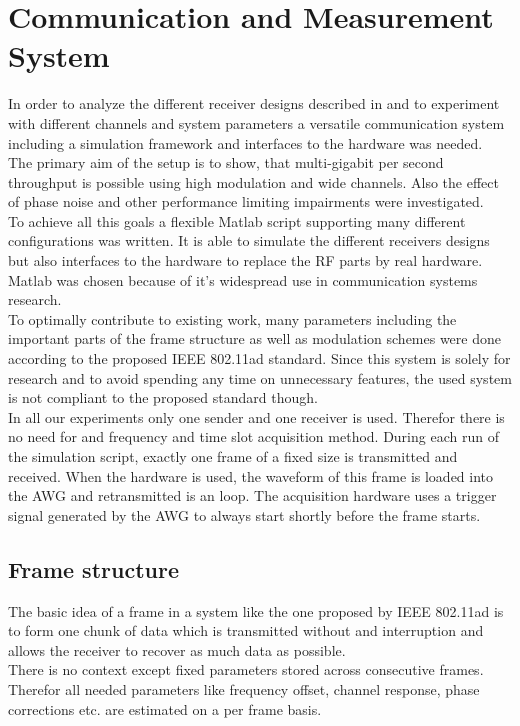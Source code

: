 \chapter{Communication and Measurement System}
In order to analyze the different receiver designs described in
 and to experiment with different channels
and system parameters a versatile communication system
including a simulation framework and interfaces to the hardware
was needed. \\

The primary aim of the setup is to show, that multi-gigabit per second
throughput is possible using high modulation and wide channels.
Also the effect of phase noise and other performance limiting impairments
were investigated. \\

To achieve all this goals a flexible Matlab script supporting
many different configurations was written. It is able to simulate
the different receivers designs but also interfaces to the hardware
to replace the \gls{RF} parts by real hardware. Matlab was chosen
because of it's widespread use in communication systems research. \\

To optimally contribute to existing work, many parameters including
the important parts of the frame structure as well as modulation
schemes were done according to the proposed \acrshort{IEEE} 802.11ad standard.
Since this system is solely for research and to avoid spending any
time on unnecessary features, the used system is not compliant to the
proposed standard though. \\

In all our experiments only one sender and one receiver is used.
Therefor there is no need for and frequency and time slot acquisition
method. During each run of the simulation script, exactly one frame
of a fixed size is transmitted and received.
When the hardware is used, the waveform of this frame is loaded into
the \gls{AWG} and retransmitted is an loop.
The acquisition hardware uses a trigger signal generated by the \gls{AWG}
to always start shortly before the frame starts.

\section{Frame structure}
\label{sec:sys_frame_struct}
The basic idea of a frame in a system like the one proposed by
IEEE 802.11ad is to form one chunk of data which is transmitted without
and interruption and allows the receiver to recover as much data as
possible. \\
There is no context except fixed parameters stored across consecutive
frames. Therefor all needed parameters like frequency offset, channel
response, phase corrections etc. are estimated on a per frame basis. \\

